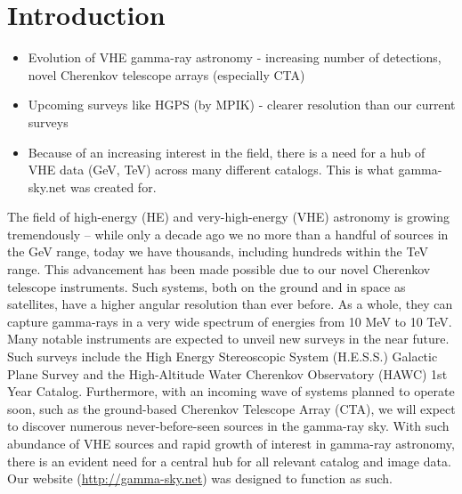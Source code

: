 \section{Introduction}

\begin{itemize}

\item Evolution of VHE gamma-ray astronomy - increasing number of detections, novel Cherenkov telescope arrays (especially CTA)

\item Upcoming surveys like HGPS (by MPIK) - clearer resolution than our current surveys

\item Because of an increasing interest in the field, there is a need for a hub of VHE data (GeV, TeV) across many different catalogs.
This is what gamma-sky.net was created for.

\end{itemize}


        The field of high-energy (HE) and very-high-energy (VHE) astronomy is growing tremendously – while only
        a decade ago we no more than a handful of sources in the GeV range, today we have thousands, including
        hundreds within the TeV range. This advancement has been made possible due to our novel Cherenkov telescope instruments.
        Such systems, both on the ground and in space as satellites, have a higher angular resolution than ever before.
        As a whole, they can capture gamma-rays in a very wide spectrum of energies from 10 MeV to 10 TeV.
        Many notable instruments are expected to unveil new surveys in the near future. Such surveys include the
        High Energy Stereoscopic System (H.E.S.S.) Galactic Plane Survey and the High-Altitude Water Cherenkov Observatory (HAWC) 1st Year Catalog.
        Furthermore, with an incoming wave of systems planned to operate soon, such as the ground-based Cherenkov Telescope Array (CTA),
        we will expect to discover numerous never-before-seen sources in the gamma-ray sky. With such abundance of VHE sources and
        rapid growth of interest in gamma-ray astronomy, there is an evident need for a central hub for all relevant catalog and image data.
        Our website (\url{http://gamma-sky.net}) was designed to function as such.
